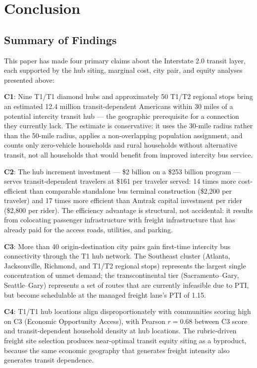 \section{Conclusion}

\subsection{Summary of Findings}

This paper has made four primary claims about the Interstate 2.0 transit layer, each supported by the hub siting, marginal cost, city pair, and equity analyses presented above:

\textbf{C1}: Nine T1/T1 diamond hubs and approximately 50 T1/T2 regional stops bring an estimated 12.4 million transit-dependent Americans within 30 miles of a potential intercity transit hub --- the geographic prerequisite for a connection they currently lack. The estimate is conservative: it uses the 30-mile radius rather than the 50-mile radius, applies a non-overlapping population assignment, and counts only zero-vehicle households and rural households without alternative transit, not all households that would benefit from improved intercity bus service.

\textbf{C2}: The hub increment investment --- \$2 billion on a \$253 billion program --- serves transit-dependent travelers at \$161 per traveler served: 14 times more cost-efficient than comparable standalone bus terminal construction (\$2,200 per traveler) and 17 times more efficient than Amtrak capital investment per rider (\$2,800 per rider). The efficiency advantage is structural, not accidental: it results from colocating passenger infrastructure with freight infrastructure that has already paid for the access roads, utilities, and parking.

\textbf{C3}: More than 40 origin-destination city pairs gain first-time intercity bus connectivity through the T1 hub network. The Southeast cluster (Atlanta, Jacksonville, Richmond, and T1/T2 regional stops) represents the largest single concentration of unmet demand; the transcontinental tier (Sacramento--Gary, Seattle--Gary) represents a set of routes that are currently infeasible due to PTI, but become schedulable at the managed freight lane's PTI of 1.15.

\textbf{C4}: T1/T1 hub locations align disproportionately with communities scoring high on C3 (Economic Opportunity Access), with Pearson $r = 0.68$ between C3 score and transit-dependent household density at hub locations. The rubric-driven freight site selection produces near-optimal transit equity siting as a byproduct, because the same economic geography that generates freight intensity also generates transit dependence.

